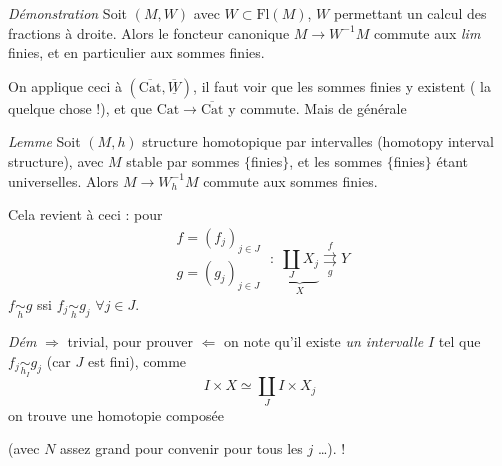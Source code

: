 \documentclass[11pt,a4paper]{article}
\begin{document}
\emph{Démonstration} Soit $(M, W)$ avec $W \subset \mathrm{Fl}(M)$,
$W$ \struck{\ill{}} permettant un calcul des fractions à droite.
 Alors  le foncteur canonique $M \to W^{-1}M$
commute aux \emph{lim} finies, \struck{\ill{}} et en particulier aux
sommes finies.

On applique ceci à $(\overline{\mathrm{Cat}}, \overline{\underline{W}})$,
il faut voir que les sommes finies y existent (\ill{} la \ill{} \ill{}
\ill{} \ill{} quelque chose !), et que $\mathrm{Cat} \to
\overline{\mathrm{Cat}}$ y commute.  Mais \ill{} de
 générale


\emph{Lemme}  Soit $(M, h)$ structure homotopique par
intervalles (homotopy interval structure), avec $M$ stable par sommes
$\{$finies$\}$, et les sommes $\{$finies$\}$ étant universelles. Alors
$M \to W_h^{-1}M$ commute aux sommes finies.

Cela revient à ceci : pour
\[
  \begin{matrix} f = (f_j)_{j \in J} \\ g = (g_j)_{j \in J} \end{matrix}
  \; : \; \underbrace{\textstyle\coprod_J X_j}_{X}
  \overset{f}{\underset{g}{\rightrightarrows}} Y
\]
$f \underset{h}{\sim} g$ ssi $f_j \underset{h}{\sim} g_j$ $\forall j \in J$.

\emph{Dém} $\Rightarrow$ trivial, pour prouver $\Leftarrow$ on note qu'il
existe \emph{un  intervalle} $I$ tel que
$f_j \underset{h_I}{\sim} g_j$ \struck{\ill{}} (car $J$ est fini),
 comme
\[
  I \times X \simeq \coprod_J I \times X_j
\]
on trouve une homotopie composée \ill{}


(avec $N$ assez grand pour convenir pour tous les $j$ …).  !
\end{document}
